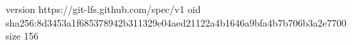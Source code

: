 version https://git-lfs.github.com/spec/v1
oid sha256:8d3453a1f685378942b311329e04aed21122a4b1646a9bfa4b7b706b3a2e7700
size 156
